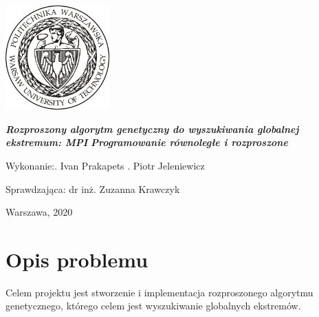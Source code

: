 \documentclass[a4paper, 12pt]{article}
\newcommand{\mainmatter}{\clearpage \cfoot{\thepage\ of \pageref{LastPage}}
\pagenumbering{arabic}}
\begin{document}
	\begin{titlepage}
\includegraphics[width = 40mm]{logo.jpg}
		\begin{center}
    			\vspace{3cm}
    					\Large\textit{\textbf{Rozproszony algorytm genetyczny  do wyszukiwania globalnej ekstremum: MPI}}
    					\Large\textit{\textbf{Programowanie równoległe i rozproszone}}
   			\vspace{4cm}
		\end{center} 

		\hfill\begin{minipage}{0.54\textwidth}
			\Large Wykonanie:. Ivan Prakapets  . Piotr Jeleniewicz 
		\vspace{\baselineskip}
		\end{minipage}
		
		\hfill\begin{minipage}{0.54\textwidth}
			\Large Sprawdzająca:\newline
		 		dr inż. Zuzanna Krawczyk
\vspace{\baselineskip}
		\end{minipage}
	
		\hfill\begin{minipage}{0.7\textwidth}
		\vspace{1cm}
			\Large Warszawa, 2020
			\vspace{\baselineskip}
		\end{minipage}
	\end{titlepage}
\newpage
\mainmatter
\setlength{\headheight}{15pt}
\doublespacing
\tableofcontents
\newpage

\linespread{0.5}

\section{Opis problemu}
\hspace*{1cm} Celem projektu jest stworzenie  i implementacja  rozproszonego algorytmu genetycznego, którego celem jest wyszukiwanie globalnych ekstremów. 
\end{document}
